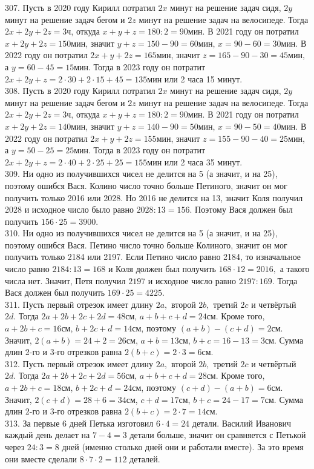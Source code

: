 307. Пусть в 2020 году Кирилл потратил $2x$ минут на решение задач сидя, $2y$ минут на решение задач бегом и $2z$ минут на решение задач на велосипеде. Тогда
$2x+2y+2z=3$ч, откуда $x+y+z=180:2=90$мин. В 2021 году он потратил $x+2y+2z=150$мин, значит $y+z=150-90=60$мин, $x=90-60=30$мин. В 2022 году он потратил $2x+y+2z=165$мин, значит $z=165-90-30=45$мин, а $y=60-45=15$мин. Тогда в 2023 году он потратит $2x+2y+z=2\cdot30+2\cdot15+45=135$мин или 2 часа 15 минут.\\
308. Пусть в 2020 году Кирилл потратил $2x$ минут на решение задач сидя, $2y$ минут на решение задач бегом и $2z$ минут на решение задач на велосипеде. Тогда
$2x+2y+2z=3$ч, откуда $x+y+z=180:2=90$мин. В 2021 году он потратил $x+2y+2z=140$мин, значит $y+z=140-90=50$мин, $x=90-50=40$мин. В 2022 году он потратил $2x+y+2z=155$мин, значит $z=155-90-40=25$мин, а $y=50-25=25$мин. Тогда в 2023 году он потратит $2x+2y+z=2\cdot40+2\cdot25+25=155$мин или 2 часа 35 минут.\\
309. Ни одно из получившихся чисел не делится на 5 (а значит, и на 25), поэтому ошибся Вася. Колино число точно больше Петиного, значит он мог получить только 2016 или 2028. Но 2016 не делится на 13, значит Коля получил 2028 и исходное число было равно $2028:13=156.$ Поэтому Вася должен был получить $156\cdot25=3900.$\\
310. Ни одно из получившихся чисел не делится на 5 (а значит, и на 25), поэтому ошибся Вася. Петино число точно больше Колиного, значит он мог получить только 2184 или 2197. Если Петино число равно 2184, то изначальное число равно $2184:13=168$ и Коля должен был получить $168\cdot12=2016,$ а такого числа нет. Значит, Петя получил $2197$ и исходное число равно $2197:169.$ Тогда Вася должен был получить $169\cdot25=4225.$\\
311. Пусть первый отрезок имеет длину $2a,$ второй $2b,$ третий $2c$ и четвёртый $2d.$ Тогда $2a+2b+2c+2d=48$см, $a+b+c+d=24$см. Кроме того, $a+2b+c=16$см, $b+2c+d=14$см, поэтому $(a+b)-(c+d)=2$см. Значит, $2(a+b)=24+2=26$см, $a+b=13$см, $b+c=16-13=3$см. Сумма длин 2-го и 3-го отрезков равна $2(b+c)=2\cdot3=6$см.\\
312. Пусть первый отрезок имеет длину $2a,$ второй $2b,$ третий $2c$ и четвёртый $2d.$ Тогда $2a+2b+2c+2d=56$см, $a+b+c+d=28$см. Кроме того, $a+2b+c=18$см, $b+2c+d=24$см, поэтому $(c+d)-(a+b)=6$см. Значит, $2(c+d)=28+6=34$см, $c+d=17$см, $b+c=24-17=7$см. Сумма длин 2-го и 3-го отрезков равна $2(b+c)=2\cdot7=14$см.\\
313. За первые 6 дней Петька изготовил $6\cdot4=24$ детали. Василий Иванович каждый день делает на $7-4=3$ детали больше, значит он сравняется с Петькой через $24:3=8$ дней (именно столько дней они и работали вместе). За это время они вместе сделали $8\cdot7\cdot2=112$ деталей.\\
